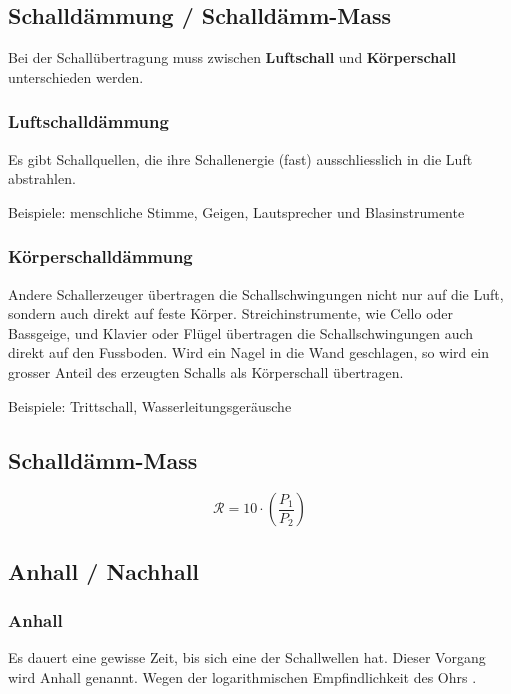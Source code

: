 \subsection{Schalldämmung / Schalldämm-Mass}

Bei der Schallübertragung muss zwischen \textbf{Luftschall} und \textbf{Körperschall} unterschieden werden.


\subsubsection{Luftschalldämmung}

Es gibt Schallquellen, die ihre Schallenergie (fast) ausschliesslich in die Luft abstrahlen.

Beispiele: menschliche Stimme, Geigen, Lautsprecher und Blasinstrumente


\subsubsection{Körperschalldämmung}

Andere Schallerzeuger übertragen die Schallschwingungen nicht nur auf die Luft, sondern auch direkt auf feste Körper. 
Streichinstrumente, wie Cello oder Bassgeige, und Klavier oder Flügel übertragen die Schallschwingungen auch direkt auf den Fussboden. 
Wird ein Nagel in die Wand geschlagen, so wird ein grosser Anteil des erzeugten Schalls als Körperschall übertragen.

Beispiele: Trittschall, Wasserleitungsgeräusche


\subsection{Schalldämm-Mass}

$$ \boxed{ \mathcal{R} = 10 \cdot \left( \frac{P_1}{P_2} \right)  } $$


\subsection{Anhall / Nachhall}

\subsubsection{Anhall}

Es dauert eine gewisse Zeit, bis sich eine  der Schallwellen  hat. Dieser Vorgang wird Anhall genannt. Wegen der logarithmischen Empfindlichkeit des Ohrs .


